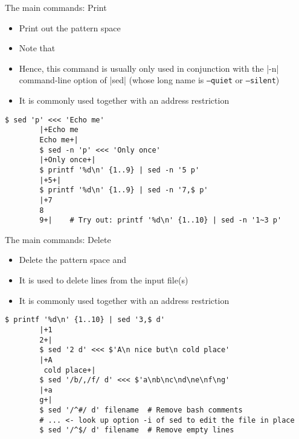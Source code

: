 \begin{frame}[fragile]{The main commands: Print}
    \vspace{-3mm}
    \begin{itemize}
        \item Print out the pattern space
        \item Note that 
        \item Hence, this command is usually only used in conjunction with the \bash|-n| command-line option of \bash|sed| (whose long name is \texttt{--quiet} or \texttt{--silent})
        \item It is commonly used together with an address restriction
    \end{itemize}
    \begin{lstlisting}[style=MyBash]
        $ sed 'p' <<< 'Echo me'
        |+Echo me
        Echo me+|
        $ sed -n 'p' <<< 'Only once'
        |+Only once+|
        $ printf '%d\n' {1..9} | sed -n '5 p'
        |+5+|
        $ printf '%d\n' {1..9} | sed -n '7,$ p'
        |+7
        8
        9+|    # Try out: printf '%d\n' {1..10} | sed -n '1~3 p'
    \end{lstlisting}
\end{frame}
\begin{frame}[fragile]{The main commands: Delete}
    \vspace{-3mm}
    \begin{itemize}
        \item Delete the pattern space and 
        \item It is used to delete lines from the input file(s)
        \item It is commonly used together with an address restriction
    \end{itemize}
    \medskip
    \begin{lstlisting}[style=MyBash]
        $ printf '%d\n' {1..10} | sed '3,$ d'
        |+1
        2+|
        $ sed '2 d' <<< $'A\n nice but\n cold place'
        |+A
         cold place+|
        $ sed '/b/,/f/ d' <<< $'a\nb\nc\nd\ne\nf\ng'
        |+a
        g+|
        $ sed '/^#/ d' filename  # Remove bash comments
        # ... <- look up option -i of sed to edit the file in place
        $ sed '/^$/ d' filename  # Remove empty lines
    \end{lstlisting}
\end{frame}
